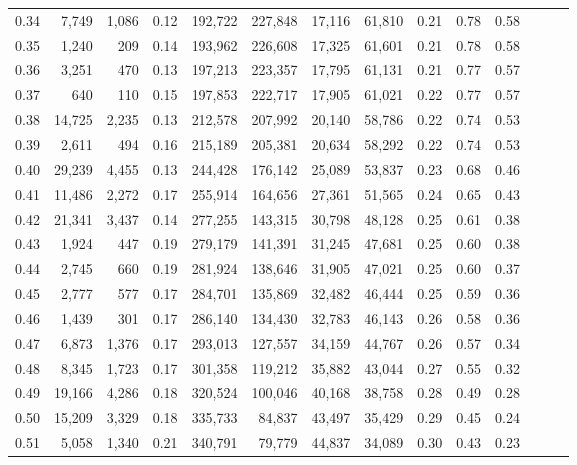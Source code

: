 \begin{tabular}{rrrrrrrrrrrrrr}
0.34 &   7,749 &  1,086 &  0.12 &  192,722 &  227,848 &  17,116 &  61,810 &  0.21 &  0.78 &      0.58 \\
0.35 &   1,240 &    209 &  0.14 &  193,962 &  226,608 &  17,325 &  61,601 &  0.21 &  0.78 &      0.58 \\
0.36 &   3,251 &    470 &  0.13 &  197,213 &  223,357 &  17,795 &  61,131 &  0.21 &  0.77 &      0.57 \\
0.37 &     640 &    110 &  0.15 &  197,853 &  222,717 &  17,905 &  61,021 &  0.22 &  0.77 &      0.57 \\
0.38 &  14,725 &  2,235 &  0.13 &  212,578 &  207,992 &  20,140 &  58,786 &  0.22 &  0.74 &      0.53 \\
0.39 &   2,611 &    494 &  0.16 &  215,189 &  205,381 &  20,634 &  58,292 &  0.22 &  0.74 &      0.53 \\
0.40 &  29,239 &  4,455 &  0.13 &  244,428 &  176,142 &  25,089 &  53,837 &  0.23 &  0.68 &      0.46 \\
0.41 &  11,486 &  2,272 &  0.17 &  255,914 &  164,656 &  27,361 &  51,565 &  0.24 &  0.65 &      0.43 \\
0.42 &  21,341 &  3,437 &  0.14 &  277,255 &  143,315 &  30,798 &  48,128 &  0.25 &  0.61 &      0.38 \\
0.43 &   1,924 &    447 &  0.19 &  279,179 &  141,391 &  31,245 &  47,681 &  0.25 &  0.60 &      0.38 \\
0.44 &   2,745 &    660 &  0.19 &  281,924 &  138,646 &  31,905 &  47,021 &  0.25 &  0.60 &      0.37 \\
0.45 &   2,777 &    577 &  0.17 &  284,701 &  135,869 &  32,482 &  46,444 &  0.25 &  0.59 &      0.36 \\
0.46 &   1,439 &    301 &  0.17 &  286,140 &  134,430 &  32,783 &  46,143 &  0.26 &  0.58 &      0.36 \\
0.47 &   6,873 &  1,376 &  0.17 &  293,013 &  127,557 &  34,159 &  44,767 &  0.26 &  0.57 &      0.34 \\
0.48 &   8,345 &  1,723 &  0.17 &  301,358 &  119,212 &  35,882 &  43,044 &  0.27 &  0.55 &      0.32 \\
0.49 &  19,166 &  4,286 &  0.18 &  320,524 &  100,046 &  40,168 &  38,758 &  0.28 &  0.49 &      0.28 \\
0.50 &  15,209 &  3,329 &  0.18 &  335,733 &   84,837 &  43,497 &  35,429 &  0.29 &  0.45 &      0.24 \\
0.51 &   5,058 &  1,340 &  0.21 &  340,791 &   79,779 &  44,837 &  34,089 &  0.30 &  0.43 &      0.23 \\

\end{tabular}
